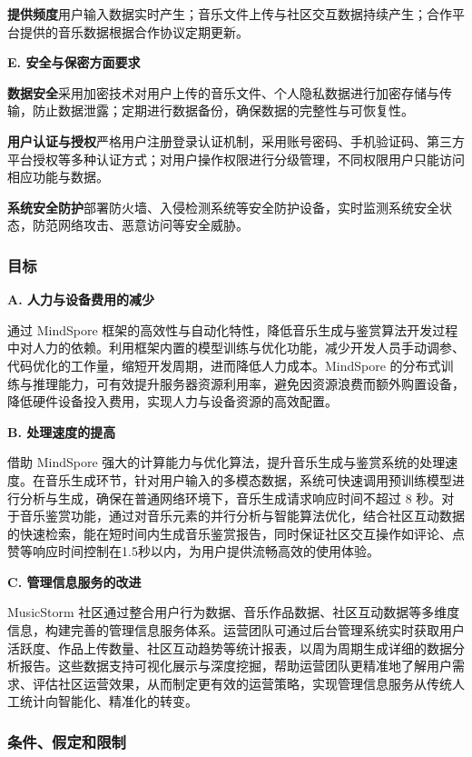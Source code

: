 \documentclass{base}
\begin{document}
\textbf{提供频度}\quad 用户输入数据实时产生；音乐文件上传与社区交互数据持续产生；合作平台提供的音乐数据根据合作协议定期更新。

\textbf{E. 安全与保密方面要求}

\textbf{数据安全}\quad 采用加密技术对用户上传的音乐文件、个人隐私数据进行加密存储与传输，防止数据泄露；定期进行数据备份，确保数据的完整性与可恢复性。​

\textbf{用户认证与授权}\quad 严格用户注册登录认证机制，采用账号密码、手机验证码、第三方平台授权等多种认证方式；对用户操作权限进行分级管理，不同权限用户只能访问相应功能与数据。​

\textbf{系统安全防护}\quad 部署防火墙、入侵检测系统等安全防护设备，实时监测系统安全状态，防范网络攻击、恶意访问等安全威胁。

\subsubsection{目标}

\textbf{A. 人力与设备费用的减少}

通过 MindSpore 框架的高效性与自动化特性，降低音乐生成与鉴赏算法开发过程中对人力的依赖。利用框架内置的模型训练与优化功能，减少开发人员手动调参、代码优化的工作量，缩短开发周期，进而降低人力成本。MindSpore 的分布式训练与推理能力，可有效提升服务器资源利用率，避免因资源浪费而额外购置设备，降低硬件设备投入费用，实现人力与设备资源的高效配置。

\textbf{B. 处理速度的提高}

借助 MindSpore 强大的计算能力与优化算法，提升音乐生成与鉴赏系统的处理速度。在音乐生成环节，针对用户输入的多模态数据，系统可快速调用预训练模型进行分析与生成，确保在普通网络环境下，音乐生成请求响应时间不超过 8 秒。对于音乐鉴赏功能，通过对音乐元素的并行分析与智能算法优化，结合社区互动数据的快速检索，能在短时间内生成音乐鉴赏报告，同时保证社区交互操作如评论、点赞等响应时间控制在1.5秒以内，为用户提供流畅高效的使用体验。

\textbf{C. 管理信息服务的改进}

MusicStorm 社区通过整合用户行为数据、音乐作品数据、社区互动数据等多维度信息，构建完善的管理信息服务体系。运营团队可通过后台管理系统实时获取用户活跃度、作品上传数量、社区互动趋势等统计报表，以周为周期生成详细的数据分析报告。这些数据支持可视化展示与深度挖掘，帮助运营团队更精准地了解用户需求、评估社区运营效果，从而制定更有效的运营策略，实现管理信息服务从传统人工统计向智能化、精准化的转变。

\subsubsection{条件、假定和限制}
\end{document}
